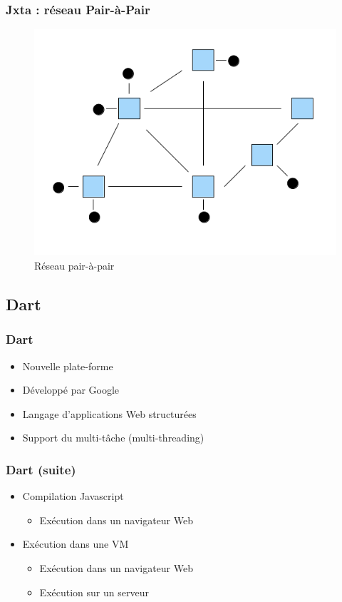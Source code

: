     \begin{frame}
      \frametitle{Jxta : réseau Pair-à-Pair}
      	\begin{figure}
			\includegraphics[scale=0.3]{includes/network-model.png}
			\caption{Réseau pair-à-pair}
	   	\end{figure}
    \end{frame}

  \subsection*{Dart}
    \begin{frame}
      \frametitle{Dart}
      \begin{itemize}
        \item Nouvelle plate-forme
        \item Développé par Google
        \item Langage d'applications Web structurées
        \item Support du multi-tâche (multi-threading)
      \end{itemize}
    \end{frame}
    \begin{frame}
      \frametitle{Dart (suite)}
      \begin{itemize}
        \item Compilation Javascript
        \begin{itemize}
          \item Exécution dans un navigateur Web
        \end{itemize}
        \item Exécution dans une VM
        \begin{itemize}
          \item Exécution dans un navigateur Web
          \item Exécution sur un serveur
        \end{itemize}
      \end{itemize}
    \end{frame}

